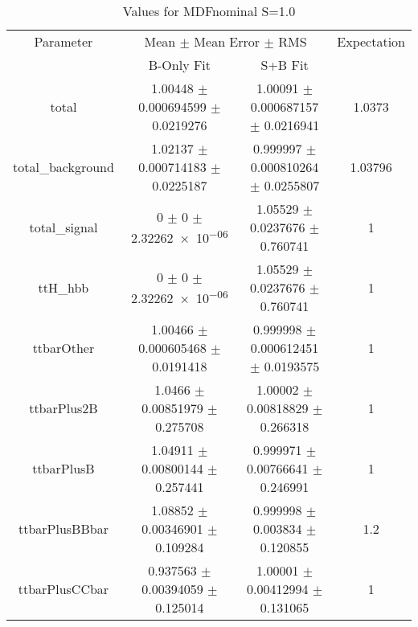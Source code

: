 \begin{table}
\centering
\caption{Values for MDFnominal S=1.0}
\begin{tabular}{cccc}
\toprule
Parameter & \multicolumn{2}{c}{Mean $\pm$ Mean Error $\pm$ RMS} & Expectation\\
 & B-Only Fit & S+B Fit & \\
\midrule
total & \num{1.00448} $\pm$ \num{0.000694599} $\pm$ \num{0.0219276} & \num{1.00091} $\pm$ \num{0.000687157} $\pm$ \num{0.0216941} & \num{1.0373}\\
total\_background & \num{1.02137} $\pm$ \num{0.000714183} $\pm$ \num{0.0225187} & \num{0.999997} $\pm$ \num{0.000810264} $\pm$ \num{0.0255807} & \num{1.03796}\\
total\_signal & \num{0} $\pm$ \num{0} $\pm$ \num{2.32262e-06} & \num{1.05529} $\pm$ \num{0.0237676} $\pm$ \num{0.760741} & \num{1}\\
ttH\_hbb & \num{0} $\pm$ \num{0} $\pm$ \num{2.32262e-06} & \num{1.05529} $\pm$ \num{0.0237676} $\pm$ \num{0.760741} & \num{1}\\
ttbarOther & \num{1.00466} $\pm$ \num{0.000605468} $\pm$ \num{0.0191418} & \num{0.999998} $\pm$ \num{0.000612451} $\pm$ \num{0.0193575} & \num{1}\\
ttbarPlus2B & \num{1.0466} $\pm$ \num{0.00851979} $\pm$ \num{0.275708} & \num{1.00002} $\pm$ \num{0.00818829} $\pm$ \num{0.266318} & \num{1}\\
ttbarPlusB & \num{1.04911} $\pm$ \num{0.00800144} $\pm$ \num{0.257441} & \num{0.999971} $\pm$ \num{0.00766641} $\pm$ \num{0.246991} & \num{1}\\
ttbarPlusBBbar & \num{1.08852} $\pm$ \num{0.00346901} $\pm$ \num{0.109284} & \num{0.999998} $\pm$ \num{0.003834} $\pm$ \num{0.120855} & \num{1.2}\\
ttbarPlusCCbar & \num{0.937563} $\pm$ \num{0.00394059} $\pm$ \num{0.125014} & \num{1.00001} $\pm$ \num{0.00412994} $\pm$ \num{0.131065} & \num{1}\\
\bottomrule
\end{tabular}
\end{table}
